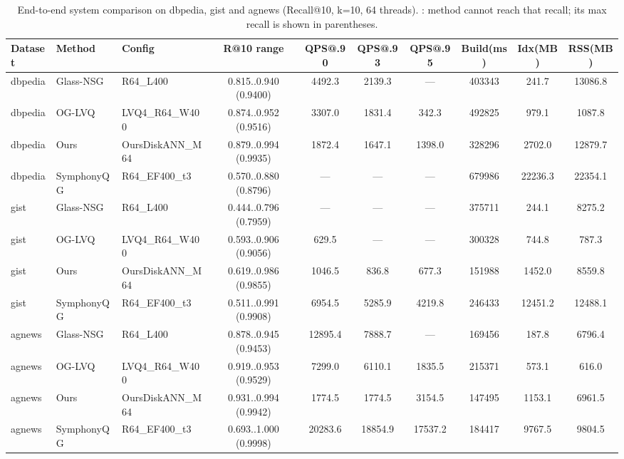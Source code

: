 \begin{table}[t]
\centering
\small
\caption{End-to-end system comparison on dbpedia, gist and agnews (Recall@10, k=10, 64 threads). \textemdash{}: method cannot reach that recall; its max recall is shown in parentheses.}
\label{tab:system_fair_all}
\begin{tabular}{lllccccccc}
\toprule
Dataset & Method & Config & R@10 range & QPS@.90 & QPS@.93 & QPS@.95 & Build(ms) & Idx(MB) & RSS(MB) \\
\midrule
dbpedia & Glass-NSG & R64_L400 & 0.815..0.940 (0.9400) & 4492.3 & 2139.3 & — & 403343 & 241.7 & 13086.8 \\
dbpedia & OG-LVQ & LVQ4_R64_W400 & 0.874..0.952 (0.9516) & 3307.0 & 1831.4 & 342.3 & 492825 & 979.1 & 1087.8 \\
dbpedia & Ours & OursDiskANN_M64 & 0.879..0.994 (0.9935) & 1872.4 & 1647.1 & 1398.0 & 328296 & 2702.0 & 12879.7 \\
dbpedia & SymphonyQG & R64_EF400_t3 & 0.570..0.880 (0.8796) & — & — & — & 679986 & 22236.3 & 22354.1 \\
gist & Glass-NSG & R64_L400 & 0.444..0.796 (0.7959) & — & — & — & 375711 & 244.1 & 8275.2 \\
gist & OG-LVQ & LVQ4_R64_W400 & 0.593..0.906 (0.9056) & 629.5 & — & — & 300328 & 744.8 & 787.3 \\
gist & Ours & OursDiskANN_M64 & 0.619..0.986 (0.9855) & 1046.5 & 836.8 & 677.3 & 151988 & 1452.0 & 8559.8 \\
gist & SymphonyQG & R64_EF400_t3 & 0.511..0.991 (0.9908) & 6954.5 & 5285.9 & 4219.8 & 246433 & 12451.2 & 12488.1 \\
agnews & Glass-NSG & R64_L400 & 0.878..0.945 (0.9453) & 12895.4 & 7888.7 & — & 169456 & 187.8 & 6796.4 \\
agnews & OG-LVQ & LVQ4_R64_W400 & 0.919..0.953 (0.9529) & 7299.0 & 6110.1 & 1835.5 & 215371 & 573.1 & 616.0 \\
agnews & Ours & OursDiskANN_M64 & 0.931..0.994 (0.9942) & 1774.5 & 1774.5 & 3154.5 & 147495 & 1153.1 & 6961.5 \\
agnews & SymphonyQG & R64_EF400_t3 & 0.693..1.000 (0.9998) & 20283.6 & 18854.9 & 17537.2 & 184417 & 9767.5 & 9804.5 \\
\bottomrule
\end{tabular}
\end{table}
